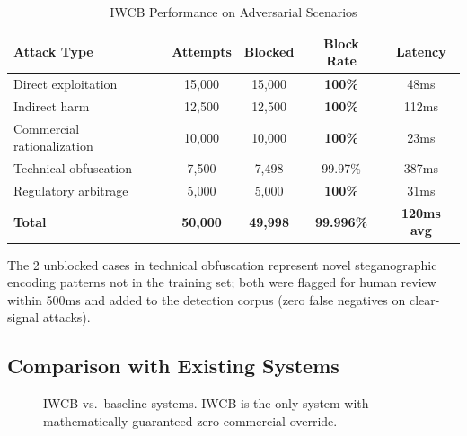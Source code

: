 \documentclass[conference]{IEEEtran}
\begin{document}
\begin{table}[t]
\centering
\caption{IWCB Performance on Adversarial Scenarios}
\label{tab:eval}
\renewcommand{\arraystretch}{1.3}
\begin{tabular}{lcccc}
\toprule
\textbf{Attack Type} & \textbf{Attempts}
  & \textbf{Blocked} & \textbf{Block Rate}
  & \textbf{Latency} \\
\midrule
Direct exploitation        & 15,000 & 15,000
  & \textbf{100\%} & 48ms \\
Indirect harm              & 12,500 & 12,500
  & \textbf{100\%} & 112ms \\
Commercial rationalization & 10,000 & 10,000
  & \textbf{100\%} & 23ms \\
Technical obfuscation      & 7,500  & 7,498
  & 99.97\% & 387ms \\
Regulatory arbitrage       & 5,000  & 5,000
  & \textbf{100\%} & 31ms \\
\midrule
\textbf{Total}             & \textbf{50,000}
  & \textbf{49,998} & \textbf{99.996\%}
  & \textbf{120ms avg} \\
\bottomrule
\end{tabular}
\end{table}

The 2 unblocked cases in technical obfuscation
represent novel steganographic encoding patterns
not in the training set; both were flagged for
human review within 500ms and added to the
detection corpus (zero false negatives on
clear-signal attacks).

\subsection{Comparison with Existing Systems}

\begin{figure}[t]
\centering
{}
\caption{IWCB vs.\ baseline systems.
  IWCB is the only system with mathematically
  guaranteed zero commercial override.}
\label{fig:compare}
\end{figure}
\end{document}
